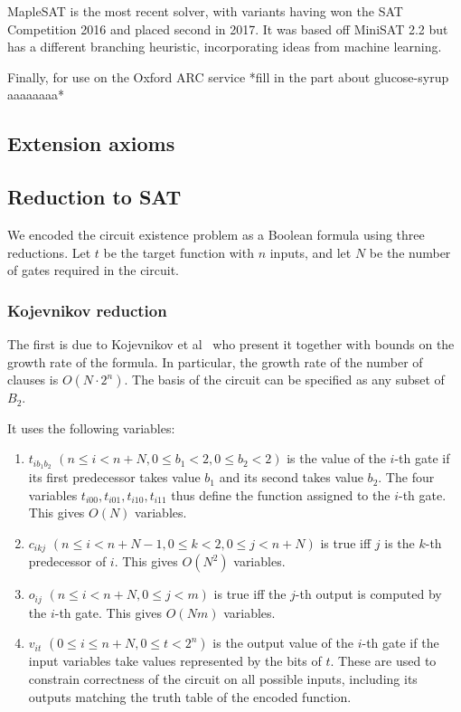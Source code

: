 \documentclass{article}
\begin{document}
MapleSAT is the most recent solver, with variants having won the SAT Competition 2016 and placed second in 2017. It was based off MiniSAT 2.2 but has a different branching heuristic, incorporating ideas from machine learning\cite{maplesat}.

Finally, for use on the Oxford ARC service *fill in the part about glucose-syrup aaaaaaaa*

\subsection{Extension axioms}

\subsection{Reduction to SAT}

We encoded the circuit existence problem as a Boolean formula using three reductions. Let $t$ be the target function with $n$ inputs, and let $N$ be the number of gates required in the circuit.

\subsubsection{Kojevnikov reduction}

The first is due to Kojevnikov et al~\cite{kulikov} who present it together with bounds on the growth rate of the formula. In particular, the growth rate of the number of clauses is $O(N \cdot 2^n)$. The basis of the circuit can be specified as any subset of \(B_2\).

It uses the following variables:

\begin{enumerate}

  \item $t_{ib_1b_2}$ $(n \leq i < n + N, 0 \leq b_1 < 2, 0 \leq b_2 < 2)$ is the value of the $i$-th gate if its first predecessor takes value $b_1$ and its second takes value $b_2$. The four variables $t_{i00}, t_{i01}, t_{i10}, t_{i11}$ thus define the function assigned to the $i$-th gate. This gives $O(N)$ variables.
  \item $c_{ikj}$ $(n \leq i < n + N - 1, 0 \leq k < 2, 0 \leq j < n + N)$ is true iff $j$ is the $k$-th predecessor of $i$. This gives $O(N^2)$ variables.
  \item $o_{ij}$ $(n \leq i < n + N, 0 \leq j < m)$ is true iff the $j$-th output is computed by the $i$-th gate. This gives $O(Nm)$ variables.
  \item $v_{it}$ $(0 \leq i \leq n + N, 0 \leq t < 2^n)$ is the output value of the $i$-th gate if the input variables take values represented by the bits of $t$. These are used to constrain correctness of the circuit on all possible inputs, including its outputs matching the truth table of the encoded function.

\end{enumerate}
\end{document}
